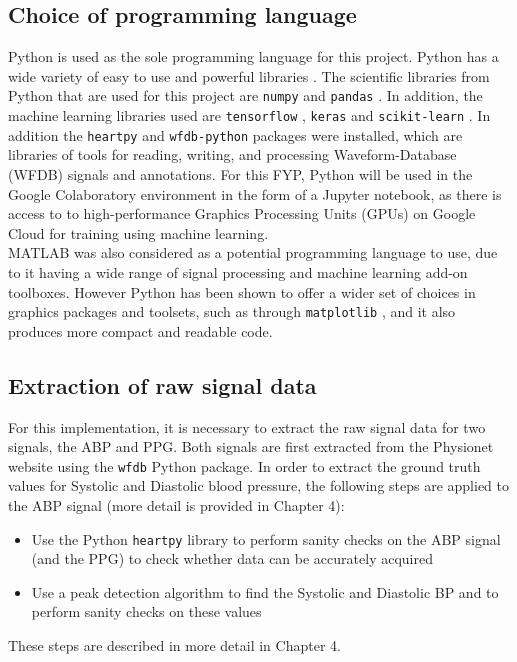 \subsection{Choice of programming language}
Python is used as the sole programming language for this project. Python has a wide 
variety of easy to use and powerful libraries \cite{Python}. The scientific libraries from Python 
that are used for this project are \texttt{numpy} \cite{numpy} and \texttt{pandas} \cite{pandas}. In addition, the 
machine learning libraries used are \texttt{tensorflow} \cite{tensorflow}, \texttt{keras} \cite{keras} and \texttt{scikit-learn} \cite{scikit}. 
In addition the \texttt{heartpy} \cite{heartpy} and \texttt{wfdb-python} \cite{wfdb} packages were installed, which are libraries of 
tools for reading, writing, and processing Waveform-Database (WFDB) signals and annotations. For this FYP, Python will be used in the Google Colaboratory environment in the form of a Jupyter notebook, as there is access to 
to high-performance Graphics Processing Units (GPUs) on Google Cloud for training using machine learning.  \\ \newline \noindent MATLAB was also 
considered as a potential programming language to use, due to it having a wide range of 
signal processing and machine learning add-on toolboxes. However Python has been shown 
to offer a wider set of choices in graphics packages and toolsets, such as 
through \texttt{matplotlib} \cite{matplotlib}, and it also produces more compact and readable 
code. 


\subsection{Extraction of raw signal data}
For this implementation, it is necessary to extract the raw signal data 
for two signals, the ABP and PPG. Both signals are first extracted from 
the Physionet website using the \texttt{wfdb} Python package. In order to extract the ground 
truth values for Systolic and Diastolic blood pressure, the following steps are applied to the ABP signal (more detail is provided in Chapter 4):

\begin{itemize}
    \item Use the Python \texttt{heartpy} library to perform sanity checks on the ABP signal (and the PPG) to check whether data can be accurately acquired 
    \item Use a peak detection algorithm to find the Systolic and Diastolic BP and to perform sanity checks on these values
\end{itemize}\noindent These steps are described in more detail in Chapter 4.


